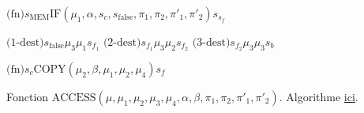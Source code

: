 \documentclass{report}
\newcommand{\aramdest}[5]{\text{(#1-dest)} 	s_{#2} #3 #4 s_{#5}} %
\newcommand{\aramfn}[3]{\text{(fn)} 		s_{#1} #2 s_{#3}}
\begin{document}
\begin{appendices}
\begin{algorithm}[H]
					$\aramfn{\text{MEM}}{\text{IF}\left( \mu_1, \alpha, s_{c}, s_{\text{false}}, \pi_1, \pi_2, \pi'_1, \pi'_2 \right)}{s_f} $\;
					
					\espace 
														
					$\aramdest{$1$}{\text{false}}{\mu_3}{\mu_1}{f_1}$ \;
					$\aramdest{$2$}{f_1}{\mu_3}{\mu_2}{f_2}$ \;
					$\aramdest{$3$}{f_2}{\mu_3}{\mu_3}{b}$ \;
					
					\espace 

					
					$\aramfn{c}{\text{COPY}\left( \mu_2, \beta, \mu_1, \mu_2, \mu_4 \right)}{f}$ \;
					
					\caption{Fonction $\text{ACCESS}\left( \mu, \mu_1, \mu_2, \mu_3, \mu_4, \alpha, \beta, \pi_1, \pi_2, \pi'_1, \pi'_2\right)$. Algorithme \hyperref[algo:A_RAM_fn_ACCESS]{ici}. }
				\end{algorithm}
				
				\espace
				
				
				
			\end{appendices}
			
			
			
			
			
			
			
			
\end{document}
